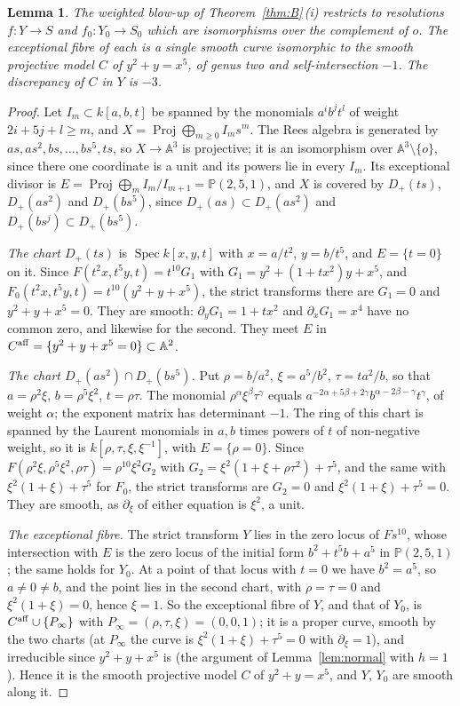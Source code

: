 \documentclass[11pt,a4paper]{article}
\newtheorem{lemma}{Lemma}[section]
\theoremstyle{definition}
\newcommand{\A}{\mathbb{A}}
\newcommand{\PP}{\mathbb{P}}
\newcommand{\Spec}{\operatorname{Spec}}
\newcommand{\Proj}{\operatorname{Proj}}
\begin{document}
\begin{lemma}\label{lem:resolution}
The weighted blow-up of Theorem~\ref{thm:B}\,(i) restricts to resolutions
$f\colon Y\to S$ and $f_0\colon Y_0\to S_0$ which are isomorphisms over the
complement of $o$. The exceptional fibre of each is a single smooth curve
isomorphic to the smooth projective model $C$ of $y^2+y=x^5$, of genus two
and self-intersection $-1$. The discrepancy of $C$ in $Y$ is $-3$.
\end{lemma}

\begin{proof}
Let $I_m\subset k[a,b,t]$ be spanned by the monomials $a^ib^jt^l$ of weight
$2i+5j+l\ge m$, and $X=\Proj\bigoplus_{m\ge0}I_ms^m$. The Rees algebra is
generated by $as,as^2,bs,\dots,bs^5,ts$, so $X\to\A^3$ is projective; it is
an isomorphism over $\A^3\setminus\{o\}$, since there one coordinate is a unit
and its powers lie in every $I_m$. Its exceptional divisor is
$E=\Proj\bigoplus_m I_m/I_{m+1}=\PP(2,5,1)$, and $X$ is covered by
$D_+(ts)$, $D_+(as^2)$ and $D_+(bs^5)$, since $D_+(as)\subset D_+(as^2)$ and
$D_+(bs^j)\subset D_+(bs^5)$.

\emph{The chart $D_+(ts)$} is $\Spec k[x,y,t]$ with $x=a/t^2$, $y=b/t^5$, and
$E=\{t=0\}$ on it. Since $F(t^2x,t^5y,t)=t^{10}G_1$ with
$G_1=y^2+(1+tx^2)y+x^5$, and $F_0(t^2x,t^5y,t)=t^{10}(y^2+y+x^5)$, the strict
transforms there are $G_1=0$ and $y^2+y+x^5=0$. They are smooth: $\partial_y
G_1=1+tx^2$ and $\partial_xG_1=x^4$ have no common zero, and likewise for the
second. They meet $E$ in $C^{\rm aff}=\{y^2+y+x^5=0\}\subset\A^2$.

\emph{The chart $D_+(as^2)\cap D_+(bs^5)$.} Put $\rho=b/a^2$, $\xi=a^5/b^2$,
$\tau=ta^2/b$, so that $a=\rho^2\xi$, $b=\rho^5\xi^2$, $t=\rho\tau$. The
monomial $\rho^\alpha\xi^\beta\tau^\gamma$ equals
$a^{-2\alpha+5\beta+2\gamma}b^{\alpha-2\beta-\gamma}t^\gamma$, of weight
$\alpha$; the exponent matrix has determinant $-1$. The ring of this chart is
spanned by the Laurent monomials in $a,b$ times powers of $t$ of non-negative
weight, so it is $k[\rho,\tau,\xi,\xi^{-1}]$, with $E=\{\rho=0\}$. Since
$F(\rho^2\xi,\rho^5\xi^2,\rho\tau)=\rho^{10}\xi^2G_2$ with
$G_2=\xi^2(1+\xi+\rho\tau^2)+\tau^5$, and the same with
$\xi^2(1+\xi)+\tau^5$ for $F_0$, the strict transforms are $G_2=0$ and
$\xi^2(1+\xi)+\tau^5=0$. They are smooth, as $\partial_\xi$ of either
equation is $\xi^2$, a unit.

\emph{The exceptional fibre.} The strict transform $Y$ lies in the zero locus
of $Fs^{10}$, whose intersection with $E$ is the zero locus of the initial
form $b^2+t^5b+a^5$ in $\PP(2,5,1)$; the same holds for $Y_0$. At a point of
that locus with $t=0$ we have $b^2=a^5$, so $a\ne0\ne b$, and the point lies
in the second chart, with $\rho=\tau=0$ and $\xi^2(1+\xi)=0$, hence $\xi=1$.
So the exceptional fibre of $Y$, and that of $Y_0$, is
$C^{\rm aff}\cup\{P_\infty\}$ with $P_\infty=(\rho,\tau,\xi)=(0,0,1)$; it is a
proper curve, smooth by the two charts (at $P_\infty$ the curve is
$\xi^2(1+\xi)+\tau^5=0$ with $\partial_\xi=1$), and irreducible since
$y^2+y+x^5$ is (the argument of Lemma~\ref{lem:normal} with $h=1$). Hence it
is the smooth projective model $C$ of $y^2+y=x^5$, and $Y$, $Y_0$ are smooth
along it.


\end{proof}
\end{document}
